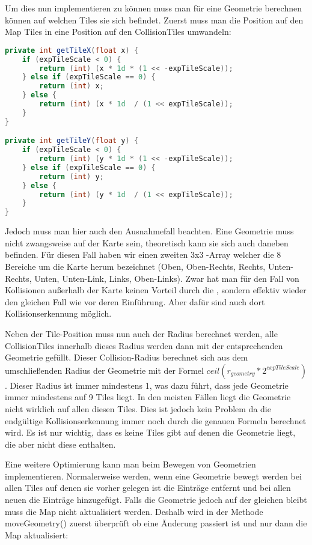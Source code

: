 Um dies nun implementieren zu können muss man für eine Geometrie berechnen können auf welchen Tiles sie sich befindet.
Zuerst muss man die Position auf den Map Tiles in eine Position auf den CollisionTiles umwandeln:

\doinline
\begin{lstlisting}[caption=Berechnen der CollisionMap-Position aus der Tile-Position, title=\hspace{0 pt}, language=java]
private int getTileX(float x) {
	if (expTileScale < 0) {
		return (int) (x * 1d * (1 << -expTileScale));		
	} else if (expTileScale == 0) {
		return (int) x;
	} else {
		return (int) (x * 1d  / (1 << expTileScale));
	}
}

private int getTileY(float y) {
	if (expTileScale < 0) {
		return (int) (y * 1d * (1 << -expTileScale));		
	} else if (expTileScale == 0) {
		return (int) y;
	} else {
		return (int) (y * 1d  / (1 << expTileScale));
	}
}
\end{lstlisting}

Jedoch muss man hier auch den Ausnahmefall beachten. Eine Geometrie muss nicht zwangsweise auf der Karte sein, theoretisch kann sie sich auch daneben befinden.
Für diesen Fall haben wir einen zweiten 3x3 -Array welcher die 8 Bereiche um die Karte herum bezeichnet (Oben, Oben-Rechts, Rechts, Unten-Rechts, Unten, Unten-Link, Links, Oben-Links). Zwar hat man für den Fall von Kollisionen außerhalb der Karte keinen Vorteil durch die , sondern effektiv wieder den gleichen Fall wie vor deren Einführung. Aber dafür sind auch dort Kollisionserkennung möglich.

Neben der Tile-Position muss nun auch der Radius berechnet werden, alle CollisionTiles innerhalb dieses Radius werden dann mit der entsprechenden Geometrie gefüllt. Dieser Collision-Radius berechnet sich aus dem umschließenden Radius der Geometrie mit der Formel $ceil(r_{geometry} * 2^{expTileScale})$.
Dieser Radius ist immer mindestens 1, was dazu führt, dass jede Geometrie immer mindestens auf 9 Tiles liegt. In den meisten Fällen liegt die Geometrie nicht wirklich auf allen diesen Tiles. Dies ist jedoch kein Problem da die endgültige Kollisionserkennung immer noch durch die genauen Formeln berechnet wird.
Es ist nur wichtig, dass es keine Tiles gibt auf denen die Geometrie liegt, die aber nicht diese enthalten.

Eine weitere Optimierung kann man beim Bewegen von Geometrien implementieren. Normalerweise werden, wenn eine Geometrie bewegt werden bei allen Tiles auf denen sie vorher gelegen ist die Einträge entfernt und bei allen neuen die Einträge hinzugefügt. Falls die Geometrie jedoch auf der gleichen  bleibt muss die Map nicht aktualisiert werden. Deshalb wird in der Methode moveGeometry() zuerst überprüft ob eine Änderung passiert ist und nur dann die Map aktualisiert:

